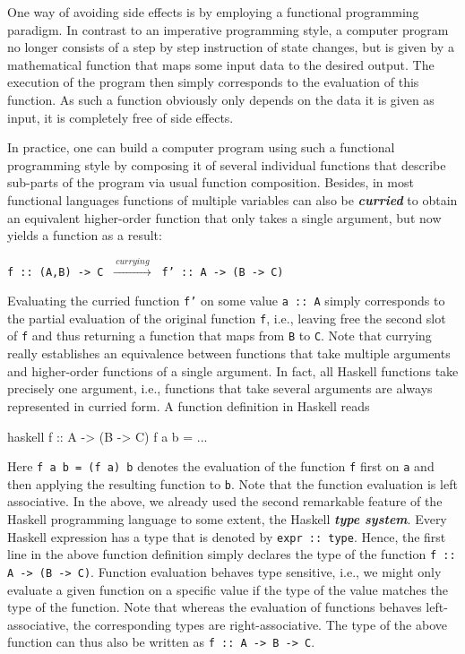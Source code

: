 One way of avoiding side effects is by employing a functional programming paradigm. In contrast to an imperative programming style, a computer program no longer consists of a step by step instruction of state changes, but is given by a mathematical function that maps some input data to the desired output. The execution of the program then simply corresponds to the evaluation of this function. As such a function obviously only depends on the data it is given as input, it is completely free of side effects.

In practice, one can build a computer program using such a functional programming style by composing it of several individual functions that describe sub-parts of the program via usual function composition. Besides, in most functional languages functions of multiple variables can also be  \textit{\textbf{curried}} to obtain an equivalent higher-order function that only takes a single argument, but now yields a function as a result:
\begin{center}
    \texttt{f :: (A,B) -> C} $\ \xrightarrow{ \ currying \ } \ $
    \texttt{f' :: A -> (B -> C)}
\end{center}
Evaluating the curried function \texttt{f'} on some value \texttt{a :: A} simply corresponds to the partial evaluation of the original function \texttt{f}, i.e., leaving free the second slot of \texttt{f} and thus returning a function that maps from \texttt{B}  to \texttt{C}. Note that currying really establishes an equivalence between functions that take multiple arguments and higher-order functions of a single argument.
In fact, all Haskell functions take precisely one argument, i.e., functions that take several arguments are always represented in curried form. A function definition in Haskell reads
\begin{center}
\begin{cminted}{haskell}
f :: A -> (B -> C)
f a b = ...  
\end{cminted}
\end{center}
Here
\texttt{f a b = (f a) b} denotes the evaluation of the function \texttt{f} first on \texttt{a} and then applying the resulting function to \texttt{b}. Note that the function evaluation is left associative.
In the above, we already used the second remarkable feature of the  Haskell programming language to some extent, the Haskell \textbf{\textit{type system}}. Every Haskell expression has a type that is denoted by \texttt{expr :: type}. Hence, the first line in the above function definition simply declares   the type of the function \texttt{f :: A -> (B -> C)}.
Function evaluation behaves type sensitive, i.e., we might only evaluate a given function on a specific value if the type of the value matches the type of the function.
Note that whereas the evaluation of functions behaves left-associative, the corresponding types are right-associative. The type of the above function can thus also be written as \texttt{f :: A -> B -> C}.

